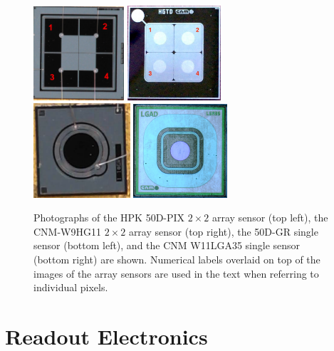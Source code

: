\documentclass[preprint,1p]{elsarticle}
\begin{document}
\begin{figure}[!htbp] 
\centering
\includegraphics[width=0.3\textwidth]{figs/HPK-50D-PIX.pdf} 
\includegraphics[width=0.31\textwidth]{figs/Hgtd_Hg11_a.jpg} \\
\includegraphics[width=0.32\textwidth]{figs/HPK-50D-GR.pdf} 
\includegraphics[width=0.31\textwidth]{figs/Lgad_Lga35_a.jpg} 
\caption{Photographs of the HPK 50D-PIX $2\times 2$ array sensor (top left), the CNM-W9HG11 $2\times 2$ 
array sensor (top right), the 50D-GR single sensor (bottom left), and the CNM W11LGA35 single 
sensor (bottom right) are shown. Numerical labels overlaid on top of the images of the array sensors are 
used in the text when referring to individual pixels.} 
\label{fig:HPK_Sensors} 
\end{figure} 


\section{Readout Electronics}
\label{sec:boards}
\end{document}
